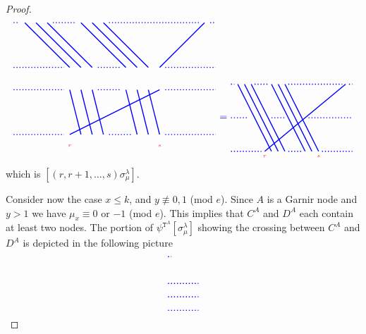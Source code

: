 \documentclass[twoside,11pt,reqno,letter]{amsart}
\numberwithin{equation}{section}
\theoremstyle{definition}  %
\newcommand{\0}{{\bar 0}}
\newcommand{\1}{{\bar 1}}
\newcommand{\la}{\lambda}
\newcommand{\si}{\sigma}
\def\T{{\mathtt T}}
\newenvironment{braid}{%
  \begin{tikzpicture}[baseline=6mm,blue,line width=1pt, scale=0.4,
                      draw/.append style={rounded corners},
                      every node/.append style={font=\tiny}]%
  }{\end{tikzpicture}
}
\begin{document}
{\begin{proof}
\[\begin{braid}
    \draw[dotted](0,10)--(0.5,10);
    \draw[dotted](0,6)--(4.5,6);
    \draw[dotted](0,4)--(4.5,4);
    \draw[dotted](0,0)--(4.5,0);

    \draw(1,10)--(5,6); \draw(5,4)--(6,0);
    \draw(2,10)--(6,6); \draw(6,4)--(7,0);
    \draw(3,10)--(7,6); \draw(7,4)--(8,0);

    \draw[dotted](3.5,10)--(5.5,10);
    \draw[dotted](7.5,6)--(9.5,6);
    \draw[dotted](7.5,4)--(9.5,4);
    \draw[dotted](8.5,0)--(10.5,0);

    \draw(6,10)--(10,6); \draw(10,4)--(11,0);
    \draw(7,10)--(11,6); \draw(11,4)--(12,0);
    \draw(8,10)--(12,6); \draw(12,4)--(13,0); \draw(13,-1)node[color=red]{$s$};

    \draw[dotted](8.5,10)--(16.5,10);

    \draw(17,10)--(13,6); \draw(13,4)--(5,0); \draw(5,-1)node[color=red]{$r$};

    \draw[dotted](17.5,10)--(18,10);
    \draw[dotted](13.5,6)--(18,6);
    \draw[dotted](13.5,4)--(18,4);
    \draw[dotted](13.5,0)--(18,0);
  \end{braid}
  \begin{braid}\tikzset{scale=0.6,baseline=12mm}
    \draw(0,5)node[font=\normalsize]{$=$};
  \end{braid}
  \begin{braid}\tikzset{scale=0.6,baseline=12mm}
    \draw[dotted](0,10)--(0.5,10);
    \draw[dotted](0,5)--(2.5,5);
    \draw[dotted](0,0)--(4.5,0);

    \draw(1,10)--(6,0);
    \draw(2,10)--(7,0);
    \draw(3,10)--(8,0);

    \draw[dotted](3.5,10)--(5.5,10);
    \draw[dotted](6,5)--(8,5);
    \draw[dotted](8.5,0)--(10.5,0);

    \draw(6,10)--(11,0);
    \draw(7,10)--(12,0);
    \draw(8,10)--(13,0)node[below,color=red]{$s$};

    \draw[dotted](8.5,10)--(16.5,10);

    \draw(17,10)--(5,0)node[below,color=red]{$r$};

    \draw[dotted](17.5,10)--(18,10);
    \draw[dotted](11.5,5)--(18,5);
    \draw[dotted](13.5,0)--(18,0);
  \end{braid}
\]
which is $[(r, r+1, \dots, s) \si^\la_\mu]$.








  Consider now the case $x \leq k$, and $y \not \equiv 0,1$ (mod $e$). Since $A$ is a Garnir node and $y>1$ we have $\mu_x \equiv 0$ or $-1$ (mod $e$). This implies that $C^A$ and $D^A$ each contain at least two nodes. 
The portion of $\psi^{\T^A} [\si^\la_\mu]$ showing the crossing between $C^A$ and $D^A$ is depicted in the following picture
\[
  \begin{braid}\tikzset{scale=0.6,baseline=12mm}
    \draw[dotted](0,10)--(0.5,10);
    \draw[dotted](0,6)--(4.5,6);
    \draw[dotted](0,4)--(4.5,4);
    \draw[dotted](0,2)--(4.5,2);


\end{braid}\]
\end{proof}}
\end{document}
